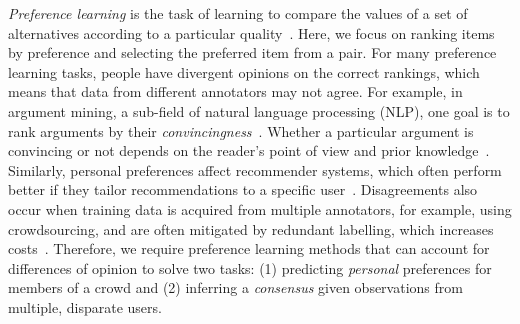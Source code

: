 %
\emph{Preference learning} is the task of learning to compare the values of a set of alternatives
according to a particular quality~\citep{furnkranz2010preference}. 
Here, we focus on ranking items by preference 
and selecting the preferred item from a pair.
For many preference learning tasks, people have divergent opinions on the correct rankings, %
which means that data from different annotators may not agree.
For example, in argument mining, 
a sub-field of natural language processing (NLP),
one goal is to rank arguments by their \emph{convincingness}~\citep{habernal2016argument}. 
Whether a particular argument is convincing or not depends on the reader's point of view and prior knowledge~\citep{lukin2017argument}.
Similarly, personal preferences affect recommender systems,
which often perform better if they tailor recommendations
to a specific user~\citep{resnick1997recommender}.
Disagreements also occur when training data is acquired from multiple annotators,
for example, using crowdsourcing,
and are often mitigated by redundant labelling, 
which increases costs~\citep{snow2008cheap,banerji2010galaxy}.
Therefore, we require preference learning methods that can account for differences of opinion
to solve two tasks:
(1) predicting \emph{personal} preferences for members of a crowd
and
(2) inferring a \emph{consensus} given observations from multiple, disparate users.

